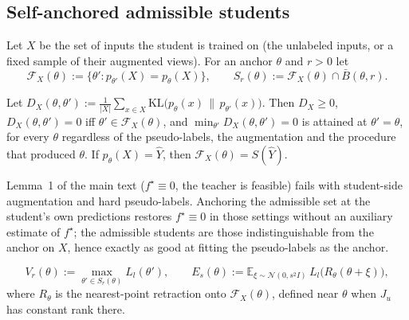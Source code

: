 
\subsection{Self-anchored admissible students}

\begin{definition}\label{def:selfanchored}
Let $X$ be the set of inputs the student is trained on (the unlabeled inputs, or a fixed
sample of their augmented views). For an anchor $\theta$ and $r>0$ let
\[
\mathcal F_X(\theta):=\{\theta' : p_{\theta'}(X)=p_\theta(X)\},\qquad
S_r(\theta):=\mathcal F_X(\theta)\cap\bar B(\theta,r).
\]
\end{definition}

\begin{lemma}\label{lem:selfanchored}
Let $D_X(\theta,\theta'):=\frac1{|X|}\sum_{x\in X}\mathrm{KL}\big(p_\theta(x)\,\|\,p_{\theta'}(x)\big)$.
Then $D_X\ge 0$, $D_X(\theta,\theta')=0$ iff $\theta'\in\mathcal F_X(\theta)$, and
$\min_{\theta'}D_X(\theta,\theta')=0$ is attained at $\theta'=\theta$, for every $\theta$
regardless of the pseudo-labels, the augmentation and the procedure that produced
$\theta$. If $p_\theta(X)=\hat Y$, then $\mathcal F_X(\theta)=S(\hat Y)$.
\end{lemma}

\begin{remark}
Lemma~1 of the main text ($f^\star\equiv0$, the teacher is feasible) fails with
student-side augmentation and hard pseudo-labels. Anchoring the admissible set at the
student's own predictions restores $f^\star\equiv0$ in those settings without an
auxiliary estimate of $f^\star$; the admissible students are those indistinguishable
from the anchor on $X$, hence exactly as good at fitting the pseudo-labels as the anchor.
\end{remark}

\begin{definition}\label{def:values}
\[
V_r(\theta):=\max_{\theta'\in S_r(\theta)}L_l(\theta'),\qquad
E_s(\theta):=\mathbb E_{\xi\sim\mathcal N(0,s^2I)}\,L_l\big(R_\theta(\theta+\xi)\big),
\]
where $R_\theta$ is the nearest-point retraction onto $\mathcal F_X(\theta)$, defined near
$\theta$ when $J_u$ has constant rank there.
\end{definition}

